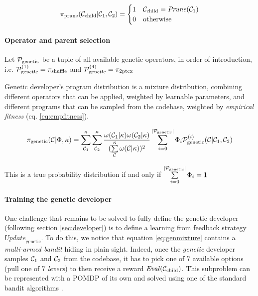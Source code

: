 \begin{equation}
    \pi_\text{prune}(\mathcal{C}_\text{child}|\mathcal{C}_1,\mathcal{C}_2)= \begin{cases}
        1 & \mathcal{C}_\text{child} = \mathit{Prune}(\mathcal{C}_1) \\
        0 & \text{otherwise}
        \end{cases}
\end{equation}

\paragraph{Operator and parent selection}

Let $\mathcal{P}_\text{genetic}$ be a tuple of all available genetic operators, in order of introduction, i.e. $\mathcal{P}_\text{genetic}^{(1)}=\pi_\text{shuffle}$ and $\mathcal{P}_\text{genetic}^{(4)}=\pi_\text{2ptcx}$

Genetic developer's program distribution is a mixture distribution, combining different operators that can be applied, weighted by learnable parameters, and different programs that can be sampled from the codebase, weighted by \emph{empirical fitness} (eq. \ref{eq:empfitness}).

\begin{equation}
    \pi_\text{genetic}(\mathcal{C} | \Phi, \kappa) = 
    \sum\limits_{\mathcal{C}_1}^{\kappa}  
    \sum\limits_{\mathcal{C}_2}^{\kappa} 
    \frac{\omega(\mathcal{C}_1|\kappa) \omega(\mathcal{C}_2|\kappa)}{(\sum\limits_{\mathcal{C}}^{\kappa} \omega(\mathcal{C}|\kappa))^2} 
    \sum\limits_{i=0}^{|\mathcal{P}_\text{genetic}|} 
    \Phi_i \mathcal{P}_\text{genetic}^{(i)} (\mathcal{C}|\mathcal{C}_1,\mathcal{C}_2)
    \label{eq:genmixture}
\end{equation}

This is a true probability distribution if and only if $\sum\limits_{i=0}^{|\mathcal{P}_\text{genetic}|} 
    \Phi_i = 1$


\paragraph{Training the genetic developer}

One challenge that remains to be solved to fully define the genetic developer (following section \ref{sec:developer}) is to define a learning from feedback strategy $\mathit{Update}_\text{genetic}$.
To do this, we notice that equation \ref{eq:genmixture} contains a \emph{multi-armed bandit} \cite{robbinsAspectsSequentialDesign1952} hiding in plain sight.
Indeed, once the \emph{genetic} developer samples $\mathcal{C}_1$ and $\mathcal{C}_2$ from the codebase, it has to pick one of 7 available options (pull one of 7 \emph{levers}) to then receive a reward $\mathit{Eval}(\mathcal{C}_\text{child})$.
This subproblem can be represented with a POMDP of its own and solved using one of the standard bandit algorithms \cite{kuleshovAlgorithmsMultiarmedBandit2014}.

